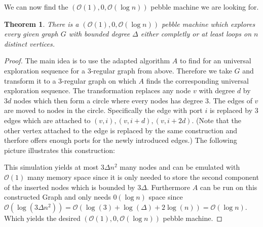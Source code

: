 \documentclass[draft,oneside]{scrartcl}
\newtheorem{thm}{Theorem}
\begin{document}
We can now find the $(\mathcal{O}(1),0,\mathcal{O}(\log n))$ pebble machine we
are looking for.
\begin{thm}
  \label{thm:pebblewalk}
  There is a $(\mathcal{O}(1),0,\mathcal{O}(\log n))$ pebble machine which
  explores every given graph $G$ with bounded degree $\Delta$ either completly
  or at least loops on $n$ distinct vertices.
\end{thm}
\begin{proof}
  The main idea is to use the adapted algorithm $A$ to find for an
  universal exploration sequence for a 3-regular graph from above. Therefore
  we take $G$ and transform it to a 3-regular graph on which $A$ finds the
  corresponding universal exploration sequence. The transformation replaces
  any node $v$ with degree $d$ by $3d$ nodes which then form a circle where
  every nodes has degree $3$. The edges of $v$ are moved to nodes in the
  circle. Specifically the edge with port $i$ is replaced by 3 edges which are
  attached to $(v,i), (v,i+d), (v,i+2d)$. (Note that the other
  vertex attached to the edge is replaced by the same construction and therfore
  offers enough ports for the newly introduced edges.) The following picture
  illustrates this construction:
  
  This simulation yields at most $3\Delta n^{2}$ many nodes and can be emulated
  with $\mathcal{O}(1)$ many memory space since it is only needed to store
  the second component of the inserted nodes which is bounded by $3\Delta$.
  Furthermore $A$ can be run on this constructed Graph and only needs
  $\mathcal{0}(\log n)$ space since $\mathcal{O}(\log(3\Delta n^{2})) =
  \mathcal{O}(\log(3) + \log(\Delta) + 2\log(n)) = \mathcal{O}(\log n)$.
  Which yields the desired $(\mathcal{O}(1),0,\mathcal{O}(\log n))$ pebble
  machine.
\end{proof}
\end{document}
